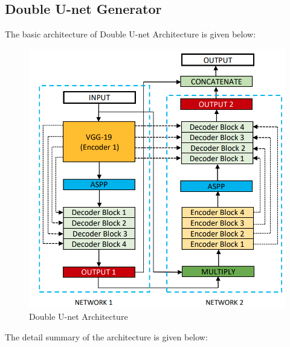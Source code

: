             \subsection{Double U-net Generator}
                The basic architecture of Double U-net Architecture is given below: 
                \begin{figure}[h]
                    \centering
                    \includegraphics[width=.8\textwidth]{img/experiments/basicDoubleU-Net.png}
                    \caption{Double U-net Architecture}
                    \label{fig: Double U-net Architecture}
                \end{figure}   
                The detail summary of the architecture is given below:

